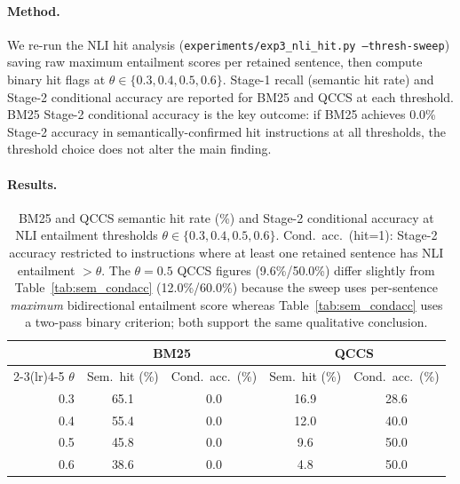 \documentclass{article}
\begin{document}
\paragraph{Method.}
We re-run the NLI hit analysis (\texttt{experiments/exp3\_nli\_hit.py --thresh-sweep})
saving raw maximum entailment scores per retained sentence, then compute binary
hit flags at $\theta \in \{0.3, 0.4, 0.5, 0.6\}$.
Stage-1 recall (semantic hit rate) and Stage-2 conditional accuracy are reported
for BM25 and QCCS at each threshold. BM25 Stage-2 conditional accuracy is the
key outcome: if BM25 achieves 0.0\% Stage-2 accuracy in semantically-confirmed
hit instructions at all thresholds, the threshold choice does not alter the
main finding.

\paragraph{Results.}

\begin{table}[H]
\centering
\caption{BM25 and QCCS semantic hit rate (\%) and Stage-2 conditional accuracy
  at NLI entailment thresholds $\theta \in \{0.3, 0.4, 0.5, 0.6\}$.
  Cond.\ acc.\ (hit=1): Stage-2 accuracy restricted to instructions where
  at least one retained sentence has NLI entailment $> \theta$.
  The $\theta{=}0.5$ QCCS figures (9.6\%/50.0\%) differ slightly from
  Table~\ref{tab:sem_condacc} (12.0\%/60.0\%) because the sweep uses
  per-sentence \emph{maximum} bidirectional entailment score whereas
  Table~\ref{tab:sem_condacc} uses a two-pass binary criterion; both
  support the same qualitative conclusion.}
\label{tab:nli_thresh}
\small
\begin{tabular}{@{}rcccc@{}}
\toprule
 & \multicolumn{2}{c}{BM25} & \multicolumn{2}{c}{QCCS} \\
\cmidrule(lr){2-3}\cmidrule(lr){4-5}
$\theta$ & Sem.\ hit (\%) & Cond.\ acc.\ (\%) & Sem.\ hit (\%) & Cond.\ acc.\ (\%) \\
\midrule
0.3 & 65.1 & 0.0 & 16.9 & 28.6 \\
0.4 & 55.4 & 0.0 & 12.0 & 40.0 \\
0.5 & 45.8 & 0.0 &  9.6 & 50.0 \\
0.6 & 38.6 & 0.0 &  4.8 & 50.0 \\
\bottomrule
\end{tabular}
\end{table}
\end{document}
